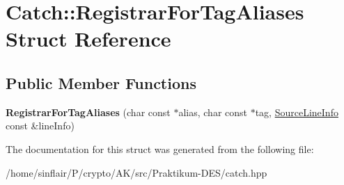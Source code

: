 \hypertarget{structCatch_1_1RegistrarForTagAliases}{}\section{Catch\+:\+:Registrar\+For\+Tag\+Aliases Struct Reference}
\label{structCatch_1_1RegistrarForTagAliases}
\subsection*{Public Member Functions}
\begin{DoxyCompactItemize}
\item 
\mbox{\label{structCatch_1_1RegistrarForTagAliases_ae4e45830e4763bcd65d55d8db9167b69}} 
{\bfseries Registrar\+For\+Tag\+Aliases} (char const $\ast$alias, char const $\ast$tag, \hyperlink{structCatch_1_1SourceLineInfo}{Source\+Line\+Info} const \&line\+Info)
\end{DoxyCompactItemize}


The documentation for this struct was generated from the following file\+:\begin{DoxyCompactItemize}
\item 
/home/sinflair/\+P/crypto/\+A\+K/src/\+Praktikum-\/\+D\+E\+S/catch.\+hpp\end{DoxyCompactItemize}
